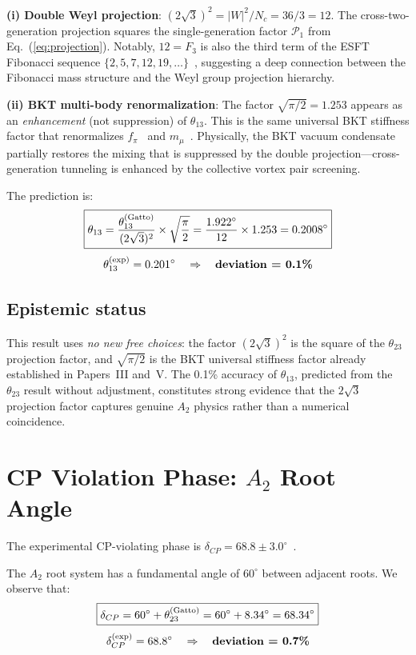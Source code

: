 ﻿\documentclass[prd,twocolumn,showpacs,superscriptaddress,groupedaddress]{revtex4-2}
\begin{document}
\textbf{(i) Double Weyl projection}: $(2\sqrt{3})^2 = |W|^2/N_c = 36/3 = 12$. The cross-two-generation projection squares the single-generation factor $\mathcal{P}_1$ from Eq.~(\ref{eq:projection}). Notably, $12 = F_3$ is also the third term of the ESFT Fibonacci sequence $\{2, 5, 7, 12, 19, \ldots\}$~\cite{Paper7}, suggesting a deep connection between the Fibonacci mass structure and the Weyl group projection hierarchy.

\textbf{(ii) BKT multi-body renormalization}: The factor $\sqrt{\pi/2} = 1.253$ appears as an \emph{enhancement} (not suppression) of $\theta_{13}$. This is the same universal BKT stiffness factor that renormalizes $f_\pi$~\cite{Paper5} and $m_\mu$~\cite{Paper3}. Physically, the BKT vacuum condensate partially restores the mixing that is suppressed by the double projection---cross-generation tunneling is enhanced by the collective vortex pair screening.

The prediction is:
\begin{equation}
\boxed{\theta_{13} = \frac{\theta_{13}^{(\rm Gatto)}}{(2\sqrt{3})^2} \times \sqrt{\frac{\pi}{2}} = \frac{1.922^\circ}{12} \times 1.253 = 0.2008^\circ}
\end{equation}
\begin{equation}
\theta_{13}^{(\rm exp)} = 0.201^\circ \quad \Rightarrow \quad \textbf{deviation = 0.1\%}
\end{equation}

\subsection{Epistemic status}

This result uses \emph{no new free choices}: the factor $(2\sqrt{3})^2$ is the square of the $\theta_{23}$ projection factor, and $\sqrt{\pi/2}$ is the BKT universal stiffness factor already established in Papers~III and~V. The 0.1\% accuracy of $\theta_{13}$, predicted from the $\theta_{23}$ result without adjustment, constitutes strong evidence that the $2\sqrt{3}$ projection factor captures genuine $A_2$ physics rather than a numerical coincidence.

\section{CP Violation Phase: $A_2$ Root Angle}

The experimental CP-violating phase is $\delta_{CP} = 68.8 \pm 3.0^\circ$~\cite{PDG2024}.

The $A_2$ root system has a fundamental angle of $60^\circ$ between adjacent roots. We observe that:
\begin{equation}
\boxed{\delta_{CP} = 60^\circ + \theta_{23}^{(\rm Gatto)} = 60^\circ + 8.34^\circ = 68.34^\circ}
\end{equation}
\begin{equation}
\delta_{CP}^{(\rm exp)} = 68.8^\circ \quad \Rightarrow \quad \textbf{deviation = 0.7\%}
\end{equation}
\end{document}
